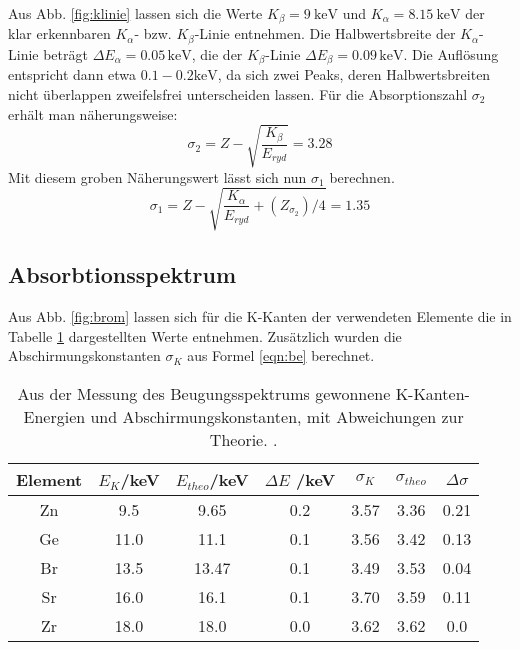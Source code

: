 Aus Abb. \ref{fig:klinie} lassen sich die Werte $K_\beta = \SI{9}{\kilo \eV}$ und $K_\alpha = \SI{8.15}{\kilo \eV}$ der klar erkennbaren $K_\alpha$- bzw. $K_\beta$-Linie entnehmen. Die Halbwertsbreite der $K_\alpha$-Linie beträgt $\Delta E_\alpha = 0.05 \,\si{\kilo \eV}$, die der $K_\beta$-Linie $\Delta E_\beta = 0.09 \, \si{\kilo \eV}$. Die Auflösung entspricht dann etwa $0.1-0.2 \si{\kilo \eV}$, da sich zwei Peaks, deren Halbwertsbreiten nicht überlappen zweifelsfrei unterscheiden lassen. Für die Absorptionszahl $\sigma_2$ erhält man näherungsweise:
\begin{equation*}
  \sigma_2 = Z-\sqrt{\frac{K_\beta}{E_{ryd}}}= 3.28
\end{equation*}
Mit diesem groben Näherungswert lässt sich nun $\sigma_1$ berechnen.
\begin{equation*}
  \sigma_1 = Z - \sqrt{\frac{K_\alpha}{E_{ryd}}+(Z_\sigma_2)/4} = 1.35
\end{equation*}


\subsection{Absorbtionsspektrum}
\label{sec:absorption}
Aus Abb. \ref{fig:brom} lassen sich für die K-Kanten der verwendeten Elemente die in Tabelle \ref{tab:Kkanten} dargestellten Werte entnehmen. Zusätzlich wurden die Abschirmungskonstanten $\sigma_K$ aus Formel \eqref{eqn:be} berechnet.

\begin{table}
  \centering
  \caption{Aus der Messung des Beugungsspektrums gewonnene K-Kanten-Energien und Abschirmungskonstanten, mit Abweichungen zur Theorie. \cite{princeton}.}
  \label{tab:Kkanten}
  \begin{tabular}{|c|c|c|c|c|c|c|}
    \toprule
    Element & $E_K$/keV & $E_{theo}$/keV & $\Delta E$ /keV & $\sigma_K$ & $\sigma_{theo}$ & $\Delta \sigma$ \\
    \midrule
    Zn & 9.5 & 9.65 & 0.2 & 3.57 & 3.36 & 0.21\\
    Ge & 11.0 & 11.1 & 0.1 & 3.56 & 3.42 & 0.13\\
    Br  & 13.5 & 13.47 & 0.1 & 3.49 & 3.53 & 0.04\\
    Sr  & 16.0 & 16.1 & 0.1 & 3.70 & 3.59 & 0.11\\
    Zr  & 18.0 & 18.0 & 0.0 & 3.62 & 3.62 & 0.0 \\
    \bottomrule
    \end{tabular}
\end{table}

